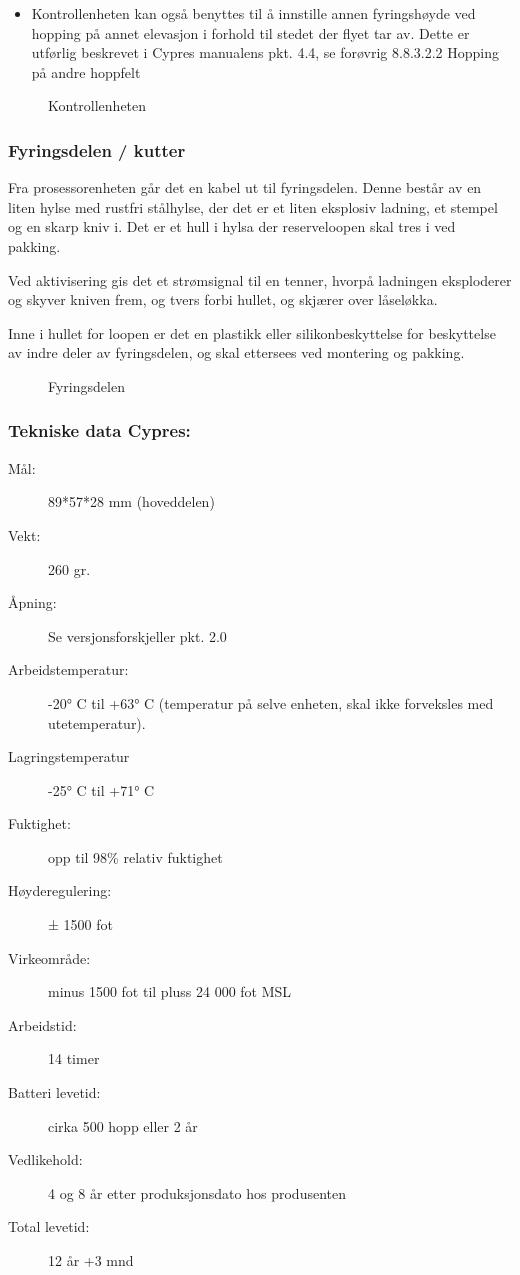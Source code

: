 \begin{itemize}
\item Kontrollenheten kan også benyttes til å innstille annen fyringshøyde ved hopping på annet elevasjon i forhold til stedet der flyet tar av. Dette er utførlig beskrevet i Cypres manualens pkt. 4.4, se forøvrig 8.8.3.2.2 Hopping på andre hoppfelt
\end{itemize}

\begin{figure}
	\caption{Kontrollenheten}
\end{figure}

\subsubsection{Fyringsdelen / kutter}
Fra prosessorenheten går det en kabel ut til fyringsdelen. Denne består av en liten hylse med rustfri stålhylse, der det er et liten eksplosiv ladning, et stempel og en skarp kniv i. Det er et hull i hylsa der reserveloopen skal tres i ved pakking.

Ved aktivisering gis det et strømsignal til en tenner, hvorpå ladningen eksploderer og skyver kniven frem, og tvers forbi hullet, og skjærer over låseløkka.

Inne i hullet for loopen er det en plastikk eller silikonbeskyttelse for beskyttelse av indre deler av fyringsdelen, og skal ettersees ved montering og pakking.

\begin{figure}
	\caption{Fyringsdelen}
\end{figure}

\subsubsection{Tekniske data Cypres:}
\begin{description}
\item[Mål:] 89*57*28 mm (hoveddelen)
\item[Vekt:] 260 gr.
\item[Åpning:] Se versjonsforskjeller pkt. 2.0
\item[Arbeidstemperatur:] -20° C til +63° C (temperatur på selve enheten, skal ikke forveksles med utetemperatur).
\item[Lagringstemperatur] -25° C til +71° C
\item[Fuktighet:] opp til 98\% relativ fuktighet
\item[Høyderegulering:] ± 1500 fot
\item[Virkeområde:] minus 1500 fot til pluss 24 000 fot MSL
\item[Arbeidstid:] 14 timer
\item[Batteri levetid:] cirka 500 hopp eller 2 år
\item[Vedlikehold:] 4 og 8 år etter produksjonsdato hos produsenten
\item[Total levetid:] 12 år +3 mnd
\end{description}


